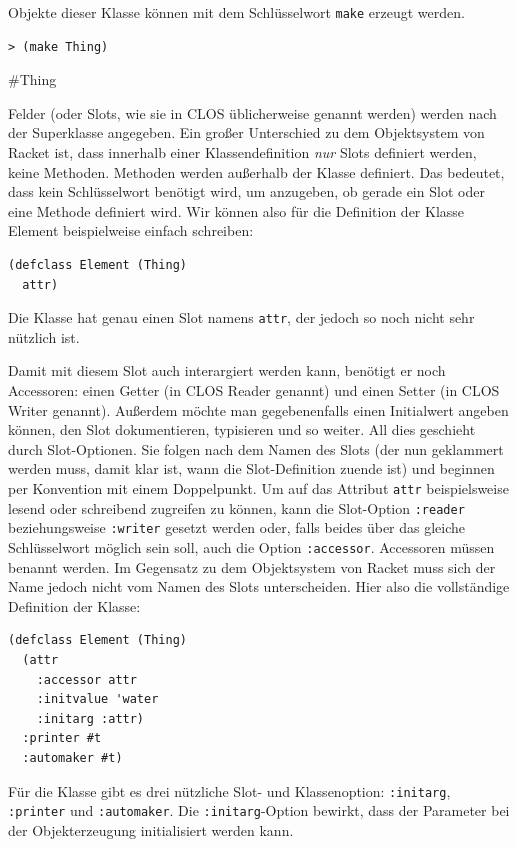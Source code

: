 Objekte dieser Klasse können mit dem Schlüsselwort \texttt{make} erzeugt werden.

\begin{lstlisting}
> (make Thing)
\end{lstlisting}
{\routput \#Thing}

Felder (oder Slots, wie sie in CLOS üblicherweise genannt werden) werden nach der Superklasse angegeben. Ein großer Unterschied zu dem Objektsystem von Racket ist, dass innerhalb einer Klassendefinition \textit{nur} Slots definiert werden, keine Methoden. Methoden werden außerhalb der Klasse definiert. Das bedeutet, dass kein Schlüsselwort benötigt wird, um anzugeben, ob gerade ein Slot oder eine Methode definiert wird. Wir können also für die Definition der Klasse Element beispielweise einfach schreiben:

\begin{lstlisting}
(defclass Element (Thing)
  attr)
\end{lstlisting}

Die Klasse hat genau einen Slot namens \texttt{attr}, der jedoch so noch nicht sehr nützlich ist.

Damit mit diesem Slot auch interargiert werden kann, benötigt er noch Accessoren: einen Getter (in CLOS Reader genannt) und einen Setter (in CLOS Writer genannt). Außerdem möchte man gegebenenfalls einen Initialwert angeben können, den Slot dokumentieren, typisieren und so weiter. All dies geschieht durch Slot-Optionen. Sie folgen nach dem Namen des Slots (der nun geklammert werden muss, damit klar ist, wann die Slot-Definition zuende ist) und beginnen per Konvention mit einem Doppelpunkt. Um auf das Attribut \texttt{attr} beispielsweise lesend oder schreibend zugreifen zu können, kann die Slot-Option \texttt{:reader} beziehungsweise \texttt{:writer} gesetzt werden oder, falls beides über das gleiche Schlüsselwort möglich sein soll, auch die Option \texttt{:accessor}. Accessoren müssen benannt werden. Im Gegensatz zu dem Objektsystem von Racket muss sich der Name jedoch nicht vom Namen des Slots unterscheiden. Hier also die vollständige Definition der Klasse:

\begin{lstlisting}
(defclass Element (Thing)
  (attr
    :accessor attr
    :initvalue 'water
    :initarg :attr)
  :printer #t
  :automaker #t)
\end{lstlisting}

Für die Klasse gibt es drei nützliche Slot- und Klassenoption: \texttt{:initarg}, \texttt{:printer} und \texttt{:automaker}. Die \texttt{:initarg}-Option bewirkt, dass der Parameter bei der Objekterzeugung initialisiert werden kann.

